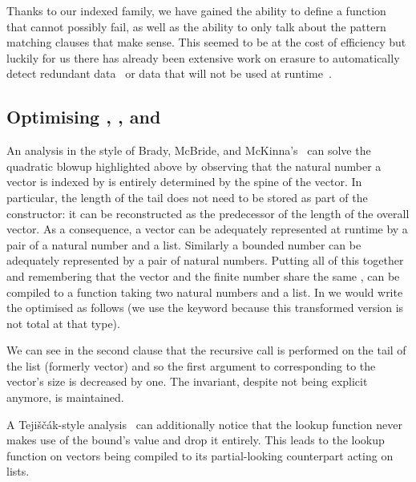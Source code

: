 
Thanks to our indexed family, we have gained the ability to define a function that cannot
possibly fail, as well as the ability to only talk about the pattern matching clauses
that make sense.
This seemed to be at the cost of efficiency but luckily for us there has already been
extensive work on erasure to automatically detect redundant
data~\cite{DBLP:conf/types/BradyMM03} or data that will not be used at
runtime~\cite{DBLP:journals/pacmpl/Tejiscak20}.

\subsection{Optimising , , and }

An analysis in the style of Brady, McBride, and McKinna's~\cite{DBLP:conf/types/BradyMM03}
can solve the quadratic blowup highlighted above by observing
that the natural number a vector is indexed by is entirely determined by the spine of
the vector. In particular, the length of the tail does not need to be stored
as part of the constructor: it can be reconstructed as the predecessor of the length
of the overall vector. As a consequence, a vector can be adequately represented at
runtime by a pair of a natural number and a list. Similarly a bounded number can be
adequately represented by a pair of natural numbers. Putting all of this together and
remembering that the vector and the finite number share the same ,
 can be compiled to a function taking two natural numbers and a list.
In \idris{} we would write the optimised  as follows (we use the
 keyword because this transformed version is not total at that type).


We can see in the second clause that the recursive call is performed on the tail of
the list (formerly vector) and so the first argument to 
corresponding to the vector's size is decreased by one. The invariant, despite not
being explicit anymore, is maintained.

A Tejiščák-style analysis~\cite{DBLP:journals/pacmpl/Tejiscak20} can additionally
notice that the lookup function never makes
use of the bound's value and drop it entirely. This leads to the lookup function on
vectors being compiled to its partial-looking counterpart acting on lists.

